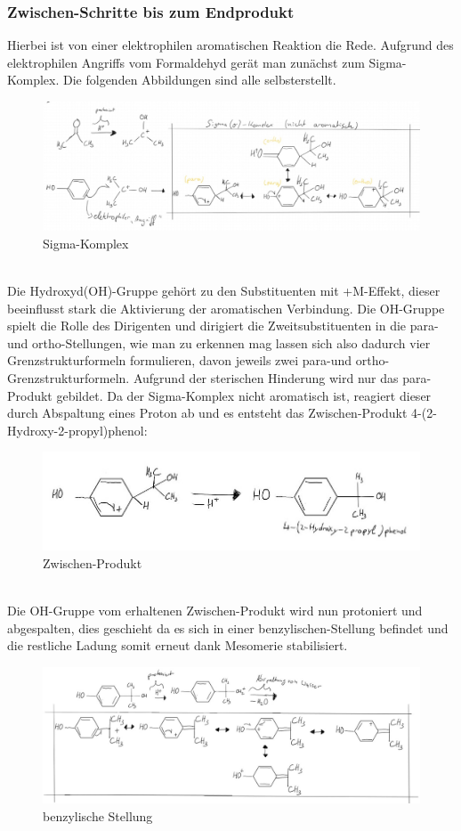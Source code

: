 \subsubsection{Zwischen-Schritte bis zum Endprodukt}
Hierbei ist von einer elektrophilen aromatischen Reaktion die Rede. Aufgrund des elektrophilen \glqq Angriffs\grqq{} vom Formaldehyd gerät man zunächst zum Sigma-Komplex. Die folgenden Abbildungen sind alle selbsterstellt.
\begin{figure}[htpb]
    \centering
    \includegraphics[width=.75\textwidth]{Sigma.jpg}
    \caption{Sigma-Komplex}
\end{figure}
\\Die Hydroxyd(OH)-Gruppe gehört zu den Substituenten mit +M-Effekt, dieser beeinflusst stark die \glqq Aktivierung\grqq{} der aromatischen Verbindung. Die OH-Gruppe spielt die Rolle des Dirigenten und dirigiert die Zweitsubstituenten in die para- und ortho-Stellungen, wie man zu erkennen mag lassen sich also dadurch vier Grenzstrukturformeln formulieren, davon jeweils zwei para-und ortho-Grenzstrukturformeln. Aufgrund der sterischen Hinderung wird nur das para-Produkt gebildet. Da der Sigma-Komplex nicht aromatisch ist, reagiert dieser durch Abspaltung eines Proton ab und es entsteht das Zwischen-Produkt 4-(2-Hydroxy-2-propyl)phenol\cite{Herstellung}:
\begin{figure}[htpb]
    \centering
    \includegraphics[width=.75\textwidth]{Zwischenprodukt.jpg}
    \caption{Zwischen-Produkt}
\end{figure}
\\Die OH-Gruppe vom erhaltenen Zwischen-Produkt wird nun protoniert und abgespalten, dies geschieht da es sich in einer \glqq benzylischen-Stellung\grqq{} befindet und die restliche Ladung somit erneut dank Mesomerie stabilisiert.
\begin{figure}[htpb]
    \centering
    \includegraphics[width=1\textwidth]{mesomerie.jpg}
    \caption{benzylische Stellung}
\end{figure}
